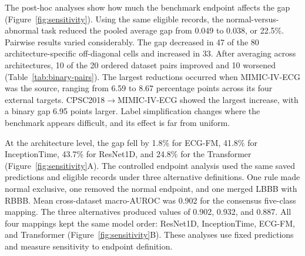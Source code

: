 \documentclass[conference]{IEEEtran}
\begin{document}
The post-hoc analyses show how much the benchmark endpoint affects the gap (Figure~\ref{fig:sensitivity}). Using the same eligible records, the normal-versus-abnormal task reduced the pooled average gap from 0.049 to 0.038, or 22.5\%. Pairwise results varied considerably. The gap decreased in 47 of the 80 architecture-specific off-diagonal cells and increased in 33. After averaging across architectures, 10 of the 20 ordered dataset pairs improved and 10 worsened (Table~\ref{tab:binary-pairs}). The largest reductions occurred when MIMIC-IV-ECG was the source, ranging from 6.59 to 8.67 percentage points across its four external targets. CPSC2018$\rightarrow$MIMIC-IV-ECG showed the largest increase, with a binary gap 6.95 points larger. Label simplification changes where the benchmark appears difficult, and its effect is far from uniform.

\begin{table}[!t]
    \caption{Change in the matched-record generalization gap after collapsing five labels to normal versus abnormal, averaged over four architectures, in percentage points. Rows are training sources and columns are evaluation targets. Positive values mean the binary endpoint reduced the gap; negative values mean it increased the gap.}
    \label{tab:binary-pairs}
    \centering
    \small
\end{table}

At the architecture level, the gap fell by 1.8\% for ECG-FM, 41.8\% for InceptionTime, 43.7\% for ResNet1D, and 24.8\% for the Transformer (Figure~\ref{fig:sensitivity}A). The controlled endpoint analysis used the same saved predictions and eligible records under three alternative definitions. One rule made normal exclusive, one removed the normal endpoint, and one merged LBBB with RBBB. Mean cross-dataset macro-AUROC was 0.902 for the consensus five-class mapping. The three alternatives produced values of 0.902, 0.932, and 0.887. All four mappings kept the same model order: ResNet1D, InceptionTime, ECG-FM, and Transformer (Figure~\ref{fig:sensitivity}B). These analyses use fixed predictions and measure sensitivity to endpoint definition.
\end{document}
